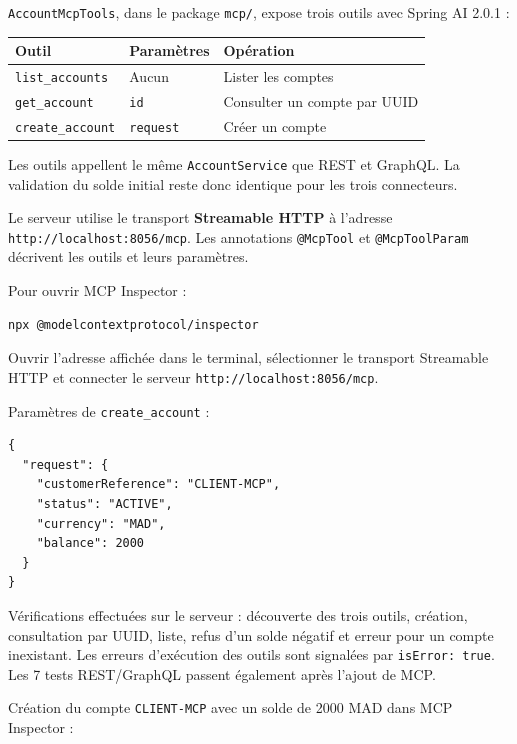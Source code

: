 \documentclass[11pt,a4paper]{report}
\begin{document}
\nolinkurl{AccountMcpTools}, dans le package \nolinkurl{mcp/}, expose trois outils avec Spring AI 2.0.1 :

\begin{table}[H]\centering\small
\begin{tabularx}{\linewidth}{XXX}\toprule
Outil & Paramètres & Opération\\
\midrule
\nolinkurl{list_accounts} & Aucun & Lister les comptes\\
\nolinkurl{get_account} & \nolinkurl{id} & Consulter un compte par UUID\\
\nolinkurl{create_account} & \nolinkurl{request} & Créer un compte\\
\bottomrule\end{tabularx}
\end{table}

Les outils appellent le même \nolinkurl{AccountService} que REST et GraphQL. La validation du solde initial reste donc identique pour les trois connecteurs.

Le serveur utilise le transport \textbf{Streamable HTTP} à l'adresse \nolinkurl{http://localhost:8056/mcp}. Les annotations \nolinkurl{@McpTool} et \nolinkurl{@McpToolParam} décrivent les outils et leurs paramètres.

Pour ouvrir MCP Inspector :

\begin{lstlisting}
npx @modelcontextprotocol/inspector
\end{lstlisting}

Ouvrir l'adresse affichée dans le terminal, sélectionner le transport Streamable HTTP et connecter le serveur \nolinkurl{http://localhost:8056/mcp}.

Paramètres de \nolinkurl{create_account} :

\begin{lstlisting}
{
  "request": {
    "customerReference": "CLIENT-MCP",
    "status": "ACTIVE",
    "currency": "MAD",
    "balance": 2000
  }
}
\end{lstlisting}

Vérifications effectuées sur le serveur : découverte des trois outils, création, consultation par UUID, liste, refus d'un solde négatif et erreur pour un compte inexistant. Les erreurs d'exécution des outils sont signalées par \nolinkurl{isError: true}. Les 7 tests REST/GraphQL passent également après l'ajout de MCP.

Création du compte \nolinkurl{CLIENT-MCP} avec un solde de 2000 MAD dans MCP Inspector :
\end{document}
